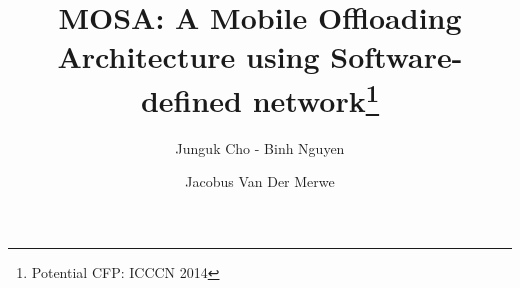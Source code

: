 \documentclass[letterpaper,twocolumn,10pt]{article}
\title{ MOSA: A Mobile Offloading Architecture using Software-defined network\footnote{Potential CFP: ICCCN 2014}}
\author[1]{Junguk Cho - Binh Nguyen}
\author[1]{Jacobus Van Der Merwe}
\affil[1]{School of Computing, University of Utah}
\date{}
\begin{document}
\maketitle



















{
  \small 
  
  
}
\end{document}
